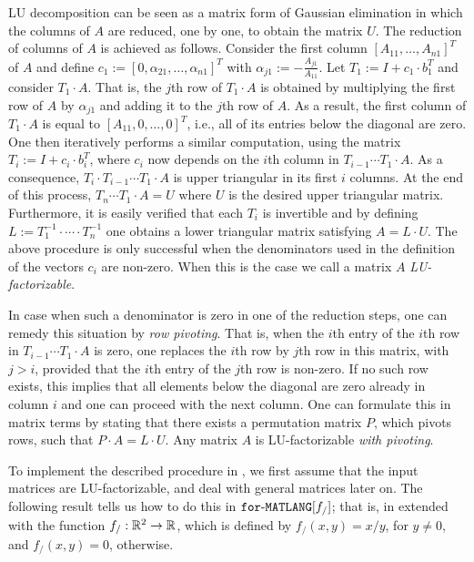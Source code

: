 LU decomposition can be seen as a matrix form of Gaussian elimination in which the columns of $A$
are reduced, one by one, to obtain the matrix $U$. The reduction of columns of $A$ is achieved
as follows. Consider the first column $[A_{11},\ldots,A_{n1}]^T$ of $A$ and  define 
$c_1 := [0, \alpha_{21},\ldots, \alpha_{n1}]^T$ 
with $\alpha_{j1} := -\frac{A_{j1}}{A_{11}}$. Let $T_1:=I+ c_1\cdot b_1^T$ and consider
$T_1\cdot A$. That is, the $j$th row of $T_1\cdot A$ is obtained by multiplying the first row of $A$ by $\alpha_{j1}$ and adding it to the $j$th row of $A$. As a result, the first column of $T_1\cdot A$ is equal to $[A_{11},0,\ldots,0]^T$, i.e., 
all of its entries below the diagonal are zero.  One then iteratively performs a similar computation, using the matrix $T_i:=I+c_i\cdot b_i^T$, where $c_i$ now depends on the $i$th column in $T_{i-1}\cdots T_1\cdot A$. As a consequence, $T_i\cdot T_{i-1}\cdots T_1\cdot A$ is upper triangular
in its first $i$ columns. At the end of this process, $T_n\cdots T_1\cdot A=U$ where $U$ is the desired upper triangular matrix.
Furthermore, it is easily verified that each $T_i$ is invertible and by defining $L:=T_1^{-1}\cdot\cdots\cdot T_n^{-1}$ one obtains a lower triangular matrix satisfying $A=L\cdot U$. The above procedure is only successful when the denominators used in the definition of the vectors $c_i$ are non-zero. When this is the case we call a matrix $A$ \textit{LU-factorizable}. 

In case when such a denominator is zero in one of the reduction steps, one can remedy this situation by \textit{row pivoting}. That is, when the $i$th entry of the
$i$th row in $T_{i-1}\cdots T_1\cdot A$ is zero, one replaces the $i$th row by  $j$th row in this matrix, with $j>i$, provided that the $i$th entry of the $j$th row is non-zero. If no such row exists, this implies that all elements below the diagonal are zero already in column $i$ and one can proceed with the next column. One can formulate this in matrix terms by stating that there exists a permutation matrix $P$, which pivots rows, such that $P\cdot A=L\cdot U$. Any matrix $A$ is LU-factorizable \textit{with pivoting}.

To implement the described procedure in \langfor, we first assume that the input matrices are LU-factorizable, and  deal with general matrices later on. The following result tells us how to do this in $\texttt{for}\text{-}\texttt{MATLANG}[f_/]$; that is, in \langfor extended with the function  $f_/:\mathbb{R}^2\to\mathbb{R}$, which is defined by $f_/(x,y)=x/y$, for $y\neq 0$, and $f_/(x,y) = 0$, otherwise. %

